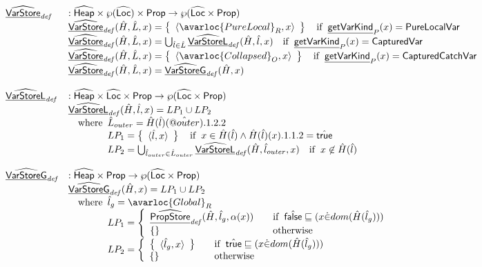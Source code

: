 \[
\begin{array}{ll}
\ahf{VarStore}_{\it def} & : \aHeap \times \powerset{\aLoc}\times \SF{Prop} \rightarrow \powerset{\aLoc \times \SF{Prop}}\\
& \ahf{VarStore}_{\it def}(\hat{H}, \hat{L}, x)
= \set{\langle\avarloc{PureLocal}_R, x\rangle} \quad\ifc{\chf{getVarKind}_P(x) = \SF{PureLocalVar}}\\
& \ahf{VarStore}_{\it def}(\hat{H}, \hat{L}, x)
= \bigcup_{\hat{l}\in\hat{L}}\ahf{VarStoreL}_{\it def}(\hat{H},\hat{l},x) \quad\ifc{\chf{getVarKind}_P(x) = \SF{CapturedVar}}\\
& \ahf{VarStore}_{\it def}(\hat{H}, \hat{L}, x)
= \set{\langle\avarloc{Collapsed}_O,x\rangle}\quad\ifc{\chf{getVarKind}_P(x) = \SF{CapturedCatchVar}}\\
& \ahf{VarStore}_{\it def}(\hat{H}, \hat{L}, x)
= \ahf{VarStoreG}_{\it def}(\hat{H}, x)
\\\\
\ahf{VarStoreL}_{\it def} & : \aHeap \times \aLoc \times \SF{Prop} \rightarrow \powerset{\aLoc \times \SF{Prop}}\\
& \ahf{VarStoreL}_{\it def}(\hat{H},\hat{l},x) = LP_1 \cup LP_2\\
& \quad\wherec{
  \hat{L}_{outer} = \hat{H}(\hat{l})(\avarprop{outer}).1.2.2\\
  LP_1 = \set{\langle\hat{l},x\rangle} \quad\ifc{x\in\hat{H}(\hat{l})\land \hat{H}(\hat{l})(x).1.1.2 = \atrue}\\
  LP_2 = \bigcup_{\hat{l}_{outer}\in\hat{L}_{outer}}\ahf{VarStoreL}_{\it def}(\hat{H},\hat{l}_{outer},x) \quad\ifc{x\not\in\hat{H}(\hat{l})}\\
}
\\\\
\ahf{VarStoreG}_{\it def} & : \aHeap \times \SF{Prop} \rightarrow \powerset{\aLoc \times \SF{Prop}}\\
& \ahf{VarStoreG}_{\it def}(\hat{H},x) = LP_1 \cup LP_2\\
& \quad\wherec{
  \hat{l}_g = \avarloc{Global}_R\\
  LP_1 = \left\{
    \begin{array}{ll}
      \ahf{PropStore}_{\it def}(\hat{H},\hat{l}_g,\alpha(x)) & \quad\ifc{\afalse\sqsubseteq(x \dot{\in} dom(\hat{H}(\hat{l}_g)))} \\
      \set{} & \quad\owc
    \end{array}
  \right.\\
  LP_2 = \left\{
    \begin{array}{ll}
      \set{\langle\hat{l}_g,x\rangle} & \quad\ifc{\atrue\sqsubseteq (x \dot{\in} dom(\hat{H}(\hat{l}_g)))} \\
      \set{} & \quad\owc
    \end{array}
  \right.\\
}
\end{array}
\]
